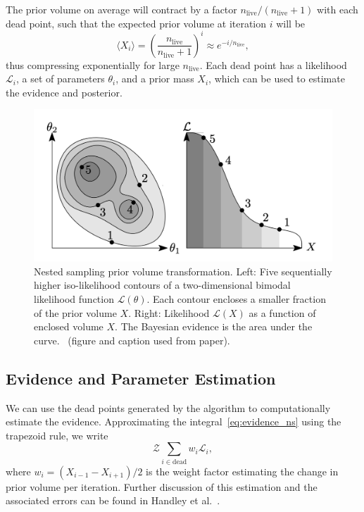 \documentclass[11pt]{article}
\begin{document}
    The prior volume on average will contract by a factor $n_{\text{live}}/(n_{\text{live}}+1)$ with each dead point, such that the
    expected prior volume at iteration $i$ will be
    \begin{equation}\label{eq:exp_prior_volume}
        \langle X_i \rangle = \left( \frac{n_{\text{live}}}{n_{\text{live}} + 1} \right)^i \approx e^{-i/n_{\text{live}}},
    \end{equation}
    thus compressing exponentially for large $n_{\text{live}}$.
    Each dead point has a likelihood $\mathcal{L}_i$, a set of parameters $\theta_i$, and a prior mass $X_i$, which can
    be used to estimate the evidence and posterior.

    \begin{figure}[t!]
        \center
        \includegraphics[width=\linewidth]{../figures/NestedSamplingPolychord}
        \caption{
            Nested sampling prior volume transformation. Left: Five sequentially higher iso-likelihood contours of a
            two-dimensional bimodal likelihood function $\mathcal{L}(\theta)$. Each contour encloses a smaller fraction
            of the prior volume $X$. Right: Likelihood $\mathcal{L}(X)$ as a function of enclosed volume $X$. The
            Bayesian evidence is the area under the curve.~\cite{Handley_polychord, Handley_2015}
            (figure and caption used from paper).
        }\label{fig:nested_sampling}
    \end{figure}


\subsection{Evidence and Parameter Estimation}\label{subsec:evidence_param_estimation}
    We can use the dead points generated by the algorithm to computationally estimate the evidence.
    Approximating the integral~\eqref{eq:evidence_ns} using the trapezoid rule, we write
    \begin{equation}\label{eq:evidence_estimation}
        \mathcal{Z} \sum_{i \in \text{dead}} w_i \mathcal{L}_i,
    \end{equation}
    where $w_i = (X_{i-1} - X_{i+1})/2$ is the weight factor estimating the change in prior volume per iteration.
    Further discussion of this estimation and the associated errors can be found in
    Handley et al.~\cite{Handley_2015, NS_Review_2022}.
\end{document}
